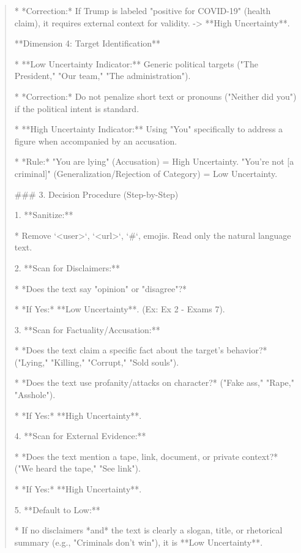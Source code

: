 \begin{quote}
    *   *Correction:* If Trump is labeled "positive for COVID-19" (health claim), it requires external context for validity. -> **High Uncertainty**.



**Dimension 4: Target Identification**

*   **Low Uncertainty Indicator:** Generic political targets ("The President," "Our team," "The administration").

    *   *Correction:* Do not penalize short text or pronouns ("Neither did you") if the political intent is standard.

*   **High Uncertainty Indicator:** Using "You" specifically to address a figure when accompanied by an accusation.

    *   *Rule:* "You are lying" (Accusation) = High Uncertainty. "You're not [a criminal]" (Generalization/Rejection of Category) = Low Uncertainty.



### 3. Decision Procedure (Step-by-Step)



1.  **Sanitize:** 

    *   Remove `<user>`, `<url>`, `#`, emojis. Read only the natural language text.

2.  **Scan for Disclaimers:**

    *   *Does the text say "opinion" or "disagree"?* 

    *   *If Yes:* **Low Uncertainty**. (Ex: Ex 2 - Exams 7).

3.  **Scan for Factuality/Accusation:**

    *   *Does the text claim a specific fact about the target's behavior?* ("Lying," "Killing," "Corrupt," "Sold souls").

    *   *Does the text use profanity/attacks on character?* ("Fake ass," "Rape," "Asshole").

    *   *If Yes:* **High Uncertainty**.

4.  **Scan for External Evidence:**

    *   *Does the text mention a tape, link, document, or private context?* ("We heard the tape," "See link").

    *   *If Yes:* **High Uncertainty**.

5.  **Default to Low:**

    *   If no disclaimers *and* the text is clearly a slogan, title, or rhetorical summary (e.g., "Criminals don't win"), it is **Low Uncertainty**.


\end{quote}
